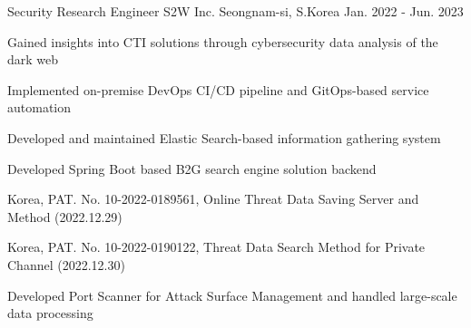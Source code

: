 \begin{cventries}
\cventry
    {Security Research Engineer} %
    {S2W Inc.} %
    {Seongnam-si, S.Korea} %
    {Jan. 2022 - Jun. 2023} %
    {
      \begin{cvitems} %
        \item {Gained insights into CTI solutions through cybersecurity data analysis of the dark web}
        \item {Implemented on-premise DevOps CI/CD pipeline and GitOps-based service automation}
        \item {Developed and maintained Elastic Search-based information gathering system}
        \item {Developed Spring Boot based B2G search engine solution backend}
        \item {Korea, PAT. No. 10-2022-0189561, Online Threat Data Saving Server and Method (2022.12.29)}
        \item {Korea, PAT. No. 10-2022-0190122, Threat Data Search Method for Private Channel (2022.12.30)}
        \item {Developed Port Scanner for Attack Surface Management and handled large-scale data processing}
      \end{cvitems}
    }


\end{cventries}
